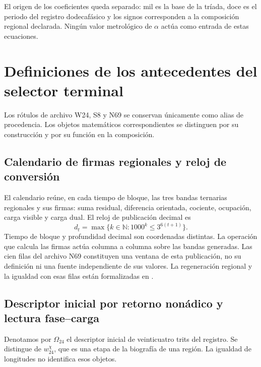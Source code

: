 \documentclass[11pt,a4paper]{article}
\begin{document}
El origen de los coeficientes queda separado: mil es la base de la tríada,
doce es el periodo del registro dodecafásico y los signos corresponden a la
composición regional declarada. Ningún valor metrológico de $\alpha$ actúa
como entrada de estas ecuaciones.

\section{Definiciones de los antecedentes del selector terminal}

Los rótulos de archivo W24, S8 y N69 se conservan únicamente como alias
de procedencia. Los objetos matemáticos correspondientes se distinguen por
su construcción y por su función en la composición.

\subsection{Calendario de firmas regionales y reloj de conversión}

El calendario reúne, en cada tiempo de bloque, las tres bandas ternarias
regionales y sus firmas: suma residual, diferencia orientada, cociente,
ocupación, carga visible y carga dual. El reloj de publicación decimal es
\[
 d_t=\max\{k\in\mathbb N:1000^k\leq3^{6(t+1)}\}.
\]
Tiempo de bloque y profundidad decimal son coordenadas distintas. La
operación que calcula las firmas actúa columna a columna sobre las bandas
generadas. Las cien filas del archivo N69 constituyen una ventana de esta
publicación, no su definición ni una fuente independiente de sus valores.
La regeneración regional y la igualdad con esas filas están formalizadas
en .

\subsection{Descriptor inicial por retorno nonádico y lectura fase--carga}

Denotamos por $\Omega_{24}$ el descriptor inicial de veinticuatro trits
del registro. Se distingue de $w_{24}^{\chi}$, que es una etapa de la
biografía de una región. La igualdad de longitudes no identifica esos
objetos.
\end{document}
